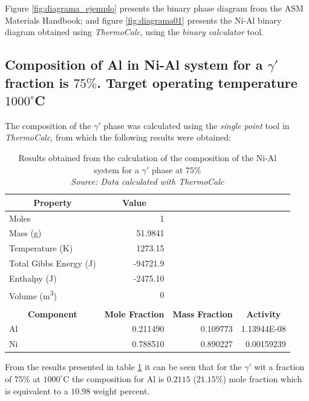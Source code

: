 Figure \ref{fig:diagrama_ejemplo} presents the binary phase diagram from the ASM Materials Handbook; and figure \ref{fig:diagrama01} presents the Ni-Al binary diagram obtained using \textit{ThermoCalc}, using the \textit{binary calculator} tool.

\newpage
\subsection{Composition of Al in Ni-Al system for a $\gamma'$ fraction is $75\%$. Target operating temperature $1000^{\circ}$C}

The composition of the $\gamma'$ phase was calculated using the \textit{single point} tool in \textit{ThermoCalc}, from which the following results were obtained:

\begin{table}[H]
    \centering
    \begin{tabular}{lrrr}
        \multicolumn{1}{c}{\textbf{Property}} & \multicolumn{1}{c}{\textbf{Value}} \\ \hline \hline
        Moles & 1 \\ 
        Mass (g) & 51.9841 \\ 
        Temperature (K) & 1273.15 \\ 
        Total Gibbs Energy (J) & -94721.9 \\
        Enthalpy (J) & -2475.10 \\
        Volume (m\textsuperscript{3}) & 0 \\ \\
        \multicolumn{1}{c}{\textbf{Component}} & \multicolumn{1}{c}{\textbf{Mole Fraction}} & \multicolumn{1}{c}{\textbf{Mass Fraction}} & \multicolumn{1}{c}{\textbf{Activity}}\\ \hline \hline
        Al & 0.211490 & 0.109773 & 1.13944E-08 \\
        Ni & 0.788510 & 0.890227 & 0.00159239
    \end{tabular}
    \caption{\centering Results obtained from the calculation of the composition of the Ni-Al system for a $\gamma'$ phase at $75\%$ \\
    \textit{Source: Data calculated with ThermoCalc \citep{thermocalc}}}
    \label{tab:tab01}
\end{table}

From the results presented in table \ref{tab:tab01} it can be seen that for the $\gamma'$ wit a fraction of $75\%$ at $1000^{\circ}$C the composition for Al is $0.2115$ ($21.15\%$) mole fraction which is equivalent to a $10.98$ weight percent.